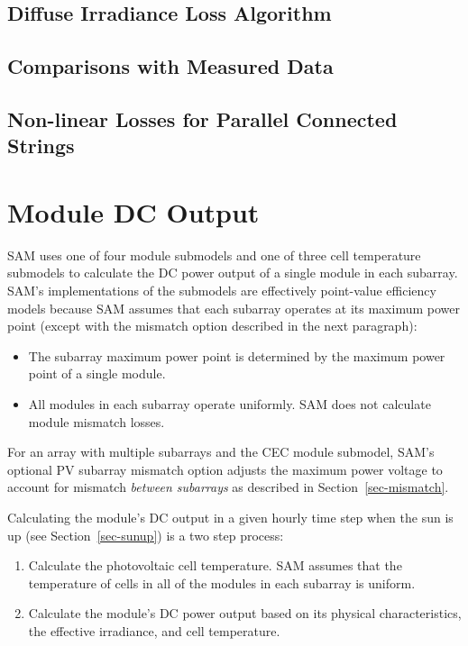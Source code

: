 \documentclass[12pt,letterpaper]{article}
\begin{document}
\section{Diffuse Irradiance Loss Algorithm}

\section{Comparisons with Measured Data}

\section{Non-linear Losses for Parallel Connected Strings}


\chapter{Module DC Output}\label{sec-module}

SAM uses one of four module submodels and one of three cell temperature submodels to calculate the DC power output of a single module in each subarray.  SAM's implementations of the submodels are effectively point-value efficiency models because SAM assumes that each subarray operates at its maximum power point (except with the mismatch option described in the next paragraph):
\begin{itemize}
\item The subarray maximum power point is determined by the maximum power point of a single module.
\item All modules in each subarray operate uniformly. SAM does not calculate module mismatch losses.
\end{itemize}

For an array with multiple subarrays and the CEC module submodel, SAM's optional PV subarray mismatch option adjusts the maximum power voltage to account for mismatch \textit{between subarrays} as described in Section~\ref{sec-mismatch}.

Calculating the module's DC output in a given hourly time step when the sun is up (see Section~\ref{sec-sunup}) is a two step process:
\begin{enumerate}
\item Calculate the photovoltaic cell temperature. SAM assumes that the temperature of cells in all of the modules in each subarray is uniform.
\item Calculate the module's DC power output based on its physical characteristics, the effective irradiance, and cell temperature.
\end{enumerate}
\end{document}
